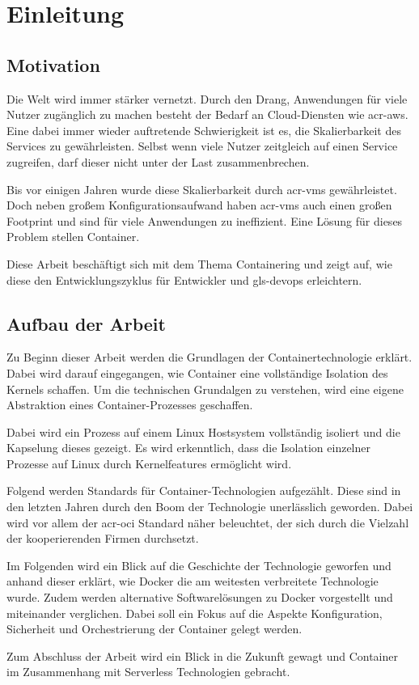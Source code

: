 \chapter{Einleitung}
\label{chap:einleitung}

\section{Motivation}
\label{sec:motivation}
Die Welt wird immer stärker vernetzt. Durch den Drang, Anwendungen für viele Nutzer zugänglich zu machen besteht der Bedarf an Cloud-Diensten wie \gls{acr-aws}.
Eine dabei immer wieder auftretende Schwierigkeit ist es, die Skalierbarkeit des Services zu gewährleisten. Selbst wenn viele Nutzer zeitgleich auf einen Service zugreifen, darf dieser nicht unter der Last zusammenbrechen.

Bis vor einigen Jahren wurde diese Skalierbarkeit durch \glspl{acr-vm} gewährleistet. Doch neben großem Konfigurationsaufwand haben \glspl{acr-vm} auch einen großen Footprint und sind für viele  Anwendungen zu ineffizient. Eine Lösung für dieses Problem stellen Container.

Diese Arbeit beschäftigt sich mit dem Thema Containering und zeigt auf, wie diese den Entwicklungszyklus für Entwickler und \gls{gls-devops} erleichtern.

\section{Aufbau der Arbeit}
\label{sec:aufbau}
Zu Beginn dieser Arbeit werden die Grundlagen der Containertechnologie erklärt. Dabei wird darauf eingegangen, wie Container eine vollständige Isolation des Kernels schaffen. Um die technischen Grundalgen zu verstehen, wird eine eigene Abstraktion eines Container-Prozesses geschaffen.

Dabei wird ein Prozess auf einem Linux Hostsystem vollständig isoliert und die Kapselung dieses gezeigt. Es wird erkenntlich, dass die Isolation einzelner Prozesse auf Linux durch Kernelfeatures ermöglicht wird.

Folgend werden Standards für Container-Technologien aufgezählt. Diese sind in den letzten Jahren durch den Boom der Technologie unerlässlich geworden. Dabei wird vor allem der \gls{acr-oci} Standard näher beleuchtet, der sich durch die Vielzahl der kooperierenden Firmen durchsetzt.

Im Folgenden wird ein Blick auf die Geschichte der Technologie geworfen und anhand dieser erklärt, wie Docker die am weitesten verbreitete Technologie wurde. Zudem werden alternative Softwarelösungen zu Docker vorgestellt und miteinander verglichen. Dabei soll ein Fokus auf die Aspekte Konfiguration, Sicherheit und Orchestrierung der Container gelegt werden.

Zum Abschluss der Arbeit wird ein Blick in die Zukunft gewagt und Container im Zusammenhang mit Serverless Technologien gebracht.